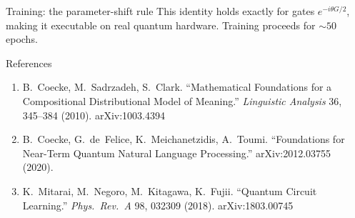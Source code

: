 \documentclass[final]{beamer}
\newlength{\sepwidth}
\newlength{\colwidth}
\newcommand{\separatorcolumn}{\begin{column}{\sepwidth}\end{column}}
\begin{document}
\begin{frame}[t]
\begin{columns}[t]
\begin{column}{\colwidth}
\begin{alertblock}{Training: the parameter-shift rule}
    This identity holds exactly for gates $e^{-i\theta G/2}$, making it executable
    on real quantum hardware. Training proceeds for $\sim\!50$ epochs.
  \end{alertblock}

  \begin{block}{References}
    \footnotesize
    \begin{enumerate}
      \item B.~Coecke, M.~Sadrzadeh, S.~Clark.
            ``Mathematical Foundations for a Compositional Distributional Model of Meaning.''
            \textit{Linguistic Analysis} 36, 345--384 (2010). arXiv:1003.4394
      \item B.~Coecke, G.~de~Felice, K.~Meichanetzidis, A.~Toumi.
            ``Foundations for Near-Term Quantum Natural Language Processing.''
            arXiv:2012.03755 (2020).
      \item K.~Mitarai, M.~Negoro, M.~Kitagawa, K.~Fujii.
            ``Quantum Circuit Learning.''
            \textit{Phys.\ Rev.\ A} 98, 032309 (2018). arXiv:1803.00745
    \end{enumerate}
  \end{block}

\end{column}

\separatorcolumn
\end{columns}
\end{frame}
\end{document}
